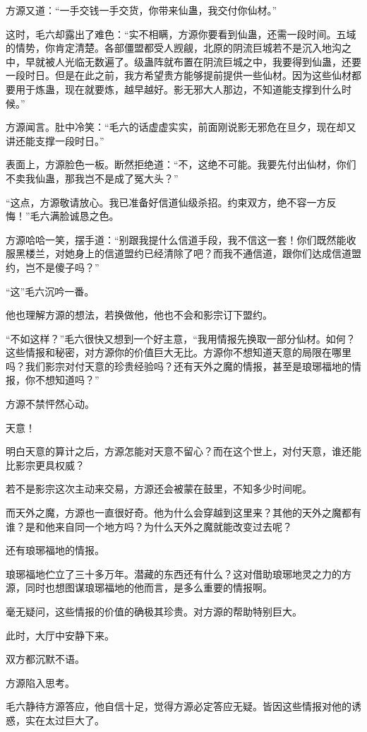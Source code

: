 \begin{this_body}
方源又道：“一手交钱一手交货，你带来仙蛊，我交付你仙材。”

这时，毛六却露出了难色：“实不相瞒，方源你要看到仙蛊，还需一段时间。五域的情势，你肯定清楚。各部僵盟都受人觊觎，北原的阴流巨城若不是沉入地沟之中，早就被人光临无数遍了。级蛊阵就布置在阴流巨城之中，我要得到仙蛊，还要一段时日。但是在此之前，我方希望贵方能够提前提供一些仙材。因为这些仙材都要用于炼蛊，现在就要炼，越早越好。影无邪大人那边，不知道能支撑到什么时候。”

方源闻言。肚中冷笑：“毛六的话虚虚实实，前面刚说影无邪危在旦夕，现在却又讲还能支撑一段时日。”

表面上，方源脸色一板。断然拒绝道：“不，这绝不可能。我要先付出仙材，你们不卖我仙蛊，那我岂不是成了冤大头？”

“这点，方源敬请放心。我已准备好信道仙级杀招。约束双方，绝不容一方反悔！”毛六满脸诚恳之色。

方源哈哈一笑，摆手道：“别跟我提什么信道手段，我不信这一套！你们既然能收服黑楼兰，对她身上的信道盟约已经清除了吧？而我不通信道，跟你们达成信道盟约，岂不是傻子吗？”

“这”毛六沉吟一番。

他也理解方源的想法，若换做他，他也不会和影宗订下盟约。

“不如这样？”毛六很快又想到一个好主意，“我用情报先换取一部分仙材。如何？这些情报和秘密，对方源你的价值巨大无比。方源你不想知道天意的局限在哪里吗？我们影宗对付天意的珍贵经验吗？还有天外之魔的情报，甚至是琅琊福地的情报，你不想知道吗？”

方源不禁怦然心动。

天意！

明白天意的算计之后，方源怎能对天意不留心？而在这个世上，对付天意，谁还能比影宗更具权威？

若不是影宗这次主动来交易，方源还会被蒙在鼓里，不知多少时间呢。

而天外之魔，方源也一直很好奇。他为什么会穿越到这里来？其他的天外之魔都有谁？是和他来自同一个地方吗？为什么天外之魔就能改变过去呢？

还有琅琊福地的情报。

琅琊福地伫立了三十多万年。潜藏的东西还有什么？这对借助琅琊地灵之力的方源，同时也想图谋琅琊福地的他而言，是多么重要的情报啊。

毫无疑问，这些情报的价值的确极其珍贵。对方源的帮助特别巨大。

此时，大厅中安静下来。

双方都沉默不语。

方源陷入思考。

毛六静待方源答应，他自信十足，觉得方源必定答应无疑。皆因这些情报对他的诱惑，实在太过巨大了。


\end{this_body}
